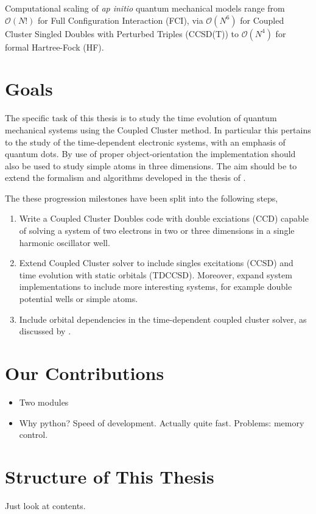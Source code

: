     Computational scaling of \emph{ap initio} quantum mechanical models range from 
    $\mathcal{O}(N!)$ for Full Configuration Interaction (FCI), via $\mathcal{O}(N^6)$ 
    for Coupled Cluster Singled Doubles with Perturbed Triples (CCSD(T)) to 
    $\mathcal{O}(N^4)$ for formal Hartree-Fock (HF)\cite{ratcliff2017challenges}.


\section{Goals}

    The specific task of this thesis is to study the time evolution of quantum 
    mechanical systems using the Coupled Cluster method. In particular this 
    pertains to the study of the time-dependent electronic systems, with an emphasis 
    of quantum dots. By use of proper object-orientation the implementation should 
    also be used to study simple atoms in three dimensions. The aim should be to 
    extend the formalism and algorithms developed in the thesis of 
    \citeauthor{haakon2017time}\citeauthor{haakon2017time}.

    The these progression milestones have been split into the following steps,

    \begin{enumerate}
        \item Write a Coupled Cluster Doubles code with double exciations (CCD)
            capable of solving a system of two electrons in two or three dimensions 
            in a single harmonic oscillator well.
        \item Extend Coupled Cluster solver to include singles excitations (CCSD)
            and time evolution with static orbitals (TDCCSD). Moreover, expand system
            implementations to include more interesting systems, for example double
            potential wells or simple atoms.
        \item Include orbital dependencies in the time-dependent coupled cluster solver, as 
            discussed by \citeauthor{kvaal2012ab}\cite{kvaal2012ab}.
    \end{enumerate}

\section{Our Contributions}

    \begin{itemize}
        \item Two modules
        \item Why python? Speed of development. Actually quite fast. 
            Problems: memory control.
    \end{itemize}

\section{Structure of This Thesis}

Just look at contents.